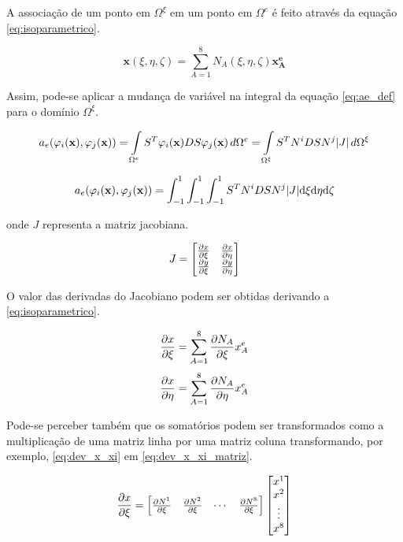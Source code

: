 A associação de um ponto em $\Omega^\xi$ em um ponto em $\Omega^e$ é feito através da equação \ref{eq:isoparametrico}.


\begin{equation}
\label{eq:isoparametrico}
\mathbf{x}(\xi, \eta, \zeta) = \sum_{A=1}^{8} N_A(\xi, \eta, \zeta) \mathbf{x^e_A}
\end{equation}

Assim, pode-se aplicar a mudança de variável na integral da equação \ref{eq:ae_def} para o domínio $\Omega^\xi$.

\begin{equation}
 a_e(\phiix,\phijx) = \omeeint{S^T\phiix D S\phijx} = \omeint[\Omega^\xi]{S^T N^i D S N^j |J|}
\end{equation}


\begin{equation}
 a_e(\phiix,\phijx) = \int^1_ {-1}\int^1_ {-1}\int^1_ {-1}{S^T N^i D S N^j |J|} \text{d}\xi \text{d}\eta \text{d}\zeta
\end{equation}

onde $J$ representa a matriz jacobiana.

\begin{equation}
J = \begin{bmatrix}
\dxi[x]   &  \deta[x]  \\
  \dxi[y] &  \deta[y] 
\end{bmatrix}
\label{eq:jacobiano}
\end{equation}

O valor das derivadas do Jacobiano podem ser obtidas derivando a \ref{eq:isoparametrico}.


\begin{equation}\label{eq:dev_x_xi}
\dxi[x] = \sum^8_{A=1} \dxi[N_A] x^e_A
\end{equation}
\begin{equation}
\deta[x] = \sum^8_{A=1} \deta[N_A] x^e_A
\end{equation}


Pode-se perceber também que os somatórios podem ser transformados como a multiplicação de uma matriz linha por uma matriz coluna transformando, por exemplo, \ref{eq:dev_x_xi} em \ref{eq:dev_x_xi_matriz}.

\begin{equation}\label{eq:dev_x_xi_matriz}
\dxi[x] =
\begin{bmatrix}
 \dxi[N^1]   & \dxi[N^2] & \cdots & \dxi[N^8]
\end{bmatrix}
\begin{bmatrix}
x^1    \\
x^2    \\
\vdots  \\
x^8
\end{bmatrix}
\end{equation}

